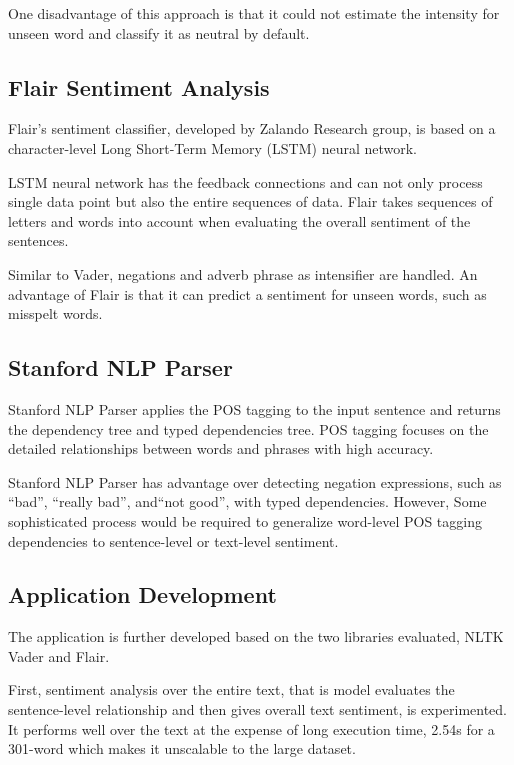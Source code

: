 \documentclass[sigconf]{acmart}
\begin{document}
One disadvantage of this approach is that it could not estimate the intensity for unseen word and classify it as neutral by default.

\subsection{Flair Sentiment Analysis}

Flair’s sentiment classifier, developed by Zalando Research group\cite{Flair}, is based on a character-level Long Short-Term Memory (LSTM)\cite{LSTM} neural network.

LSTM neural network has the feedback connections and can not only process single data point but also the entire sequences of data. Flair takes sequences of letters and words into account when evaluating the overall sentiment of the sentences.

Similar to Vader, negations and adverb phrase as intensifier are handled. An advantage of Flair is that it can predict a sentiment for unseen words, such as misspelt words.

\subsection{Stanford NLP Parser}

Stanford NLP Parser applies the POS tagging to the input sentence and returns the dependency tree and typed dependencies tree. POS tagging focuses on the detailed relationships between words and phrases with high accuracy.

Stanford NLP Parser has advantage over detecting negation expressions, such as “bad”, “really bad”, and“not good”, with typed dependencies. However, Some sophisticated process would be required to generalize word-level POS tagging dependencies to sentence-level or text-level sentiment. 

\subsection{Application Development}
The application is further developed  based on the two libraries evaluated, NLTK Vader and Flair. 

First, sentiment analysis over the entire text, that is model evaluates the sentence-level relationship and then gives overall text sentiment, is experimented. It performs well over the text at the expense of long execution time, 2.54s for a 301-word which makes it unscalable to the large dataset.
\end{document}
